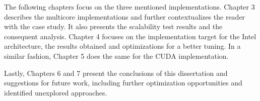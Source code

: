\documentclass[../thesis]{subfiles}
\begin{document}
	The following chapters focus on the three mentioned implementations. Chapter 3 describes the multicore implementations and further contextualizes the reader with the case study. It also presents the scalability test results and the consequent analysis. Chapter 4 focuses on the implementation target for the Intel \mic architecture, the results obtained and optimizations for a better tuning. In a similar fashion, Chapter 5 does the same for the CUDA implementation.

	Lastly, Chapters 6 and 7 present the conclusions of this dissertation and suggestions for future work, including further optimization opportunities and identified unexplored approaches.

\end{document}
